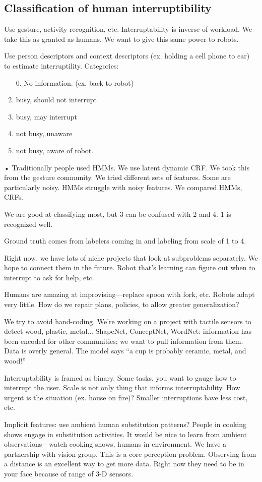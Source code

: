 \subsection{Classification of human interruptibility}

Use gesture, activity recognition, etc. Interruptability is inverse of workload. We take this as granted as humans. We want to give this same power to robots.

Use person descriptors and context descriptors (ex. holding a cell phone to ear) to estimate interruptility. Categories: 
\begin{enumerate}
\item[0.] No information. (ex. back to robot)
\item busy, should not interrupt
\item
busy, may interrupt
\item
not busy, unaware
\item
not busy, aware of robot.
\end{enumerate}•
Traditionally people used HMMs. We use latent dynamic CRF. We took this from the gesture community. %
We tried different sets of features. Some are particularly noisy. HMMs struggle with noisy features. We compared HMMs, CRFs. 

We are good at classifying most, but 3 can be confused with 2 and 4. 1 is recognized well.

Ground truth comes from labelers coming in and labeling from scale of 1 to 4.


Right now, we have lots of niche projects that look at subproblems separately. We hope to connect them in the future. Robot that's learning can figure out when to interrupt to ask for help, etc.

Humans are amazing at improvising---replace spoon with fork, etc. Robots adapt very little. How do we repair plans, policies, to allow greater generalization? 

We try to avoid hand-coding. We're working on a project with tactile sensors to detect wood, plastic, metal... ShapeNet, ConceptNet, WordNet: information has been encoded for other communities; we want to pull information from them. Data is overly general. The model says ``a cup is probably ceramic, metal, and wood!''

Interruptability is framed as binary. Some tasks, you want to gauge how to interrupt the user. Scale is not only thing that informs interruptability. How urgent is the situation (ex. house on fire)? Smaller interruptions have less cost, etc.

Implicit features: use ambient human substitution patterns? People in cooking shows engage in substitution activities. %
It would be nice to learn from ambient observations---watch cooking shows, humans in environment. We have a partnership with vision group. This is a core perception problem. Observing from a distance is an excellent way to get more data. Right now they need to be in your face because of range of 3-D sensors.